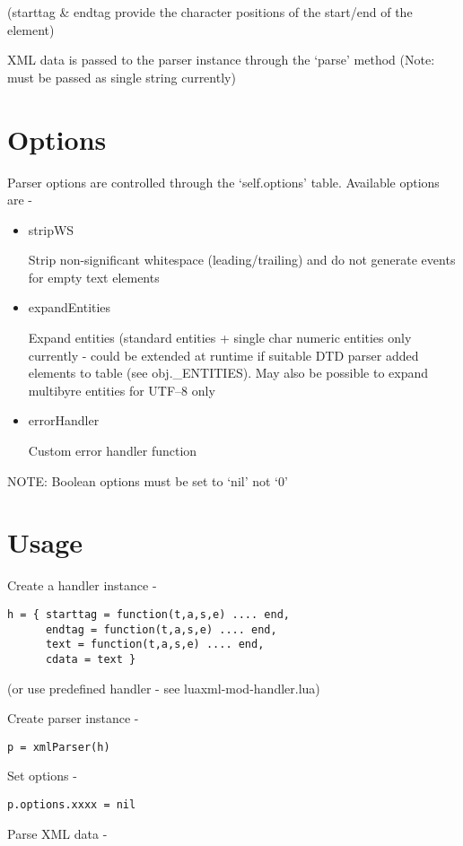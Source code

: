 \documentclass{ltxdoc}
\begin{document}
(starttag \& endtag provide the character positions of the start/end of the
element)

XML data is passed to the parser instance through the `parse' method
(Note: must be passed as single string currently)

\section{Options}

Parser options are controlled through the `self.options' table.
Available options are -

\begin{itemize}
\item
  stripWS

  Strip non-significant whitespace (leading/trailing) and do not
  generate events for empty text elements
\item
  expandEntities

  Expand entities (standard entities + single char numeric entities only
  currently - could be extended at runtime if suitable DTD parser added
  elements to table (see obj.\_ENTITIES). May also be possible to expand
  multibyre entities for UTF--8 only
\item
  errorHandler

  Custom error handler function
\end{itemize}
NOTE: Boolean options must be set to `nil' not `0'

\section{Usage}

Create a handler instance -

\begin{verbatim}
h = { starttag = function(t,a,s,e) .... end,
      endtag = function(t,a,s,e) .... end,
      text = function(t,a,s,e) .... end,
      cdata = text }
\end{verbatim}
(or use predefined handler - see luaxml-mod-handler.lua)

Create parser instance -

\begin{verbatim}
p = xmlParser(h)
\end{verbatim}
Set options -

\begin{verbatim}
p.options.xxxx = nil
\end{verbatim}
Parse XML data -
\end{document}
